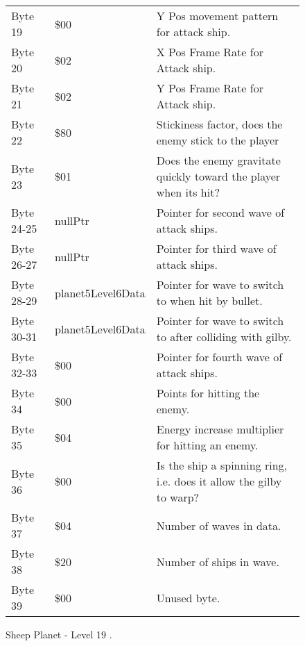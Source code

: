 \begin{figure}[H]
{\begin{adjustbox}{width=12cm}
\begin{tabular}{lll}
 Byte 19    & \$00                & Y Pos movement pattern for attack ship.                             \\
 Byte 20    & \$02                & X Pos Frame Rate for Attack ship.                                   \\
 Byte 21    & \$02                & Y Pos Frame Rate for Attack ship.                                   \\
 Byte 22    & \$80                & Stickiness factor, does the enemy stick to the player               \\
 Byte 23    & \$01                & Does the enemy gravitate quickly toward the player when its hit?    \\
 Byte 24-25 & nullPtr            & Pointer for second wave of attack ships.                            \\
 Byte 26-27 & nullPtr            & Pointer for third wave of attack ships.                             \\
 Byte 28-29 & planet5Level6Data  & Pointer for wave to switch to when hit by bullet.                   \\
 Byte 30-31 & planet5Level6Data  & Pointer for  wave to switch to after colliding with gilby.          \\
 Byte 32-33 & \$00                & Pointer for fourth wave of attack ships.                            \\
 Byte 34    & \$00                & Points for hitting the enemy.                                       \\
 Byte 35    & \$04                & Energy increase multiplier for hitting an enemy.                    \\
 Byte 36    & \$00                & Is the ship a spinning ring, i.e. does it allow the gilby to warp?  \\
 Byte 37    & \$04                & Number of waves in data.                                            \\
 Byte 38    & \$20                & Number of ships in wave.                                            \\
 Byte 39    & \$00                & Unused byte.                                                        \\
\bottomrule
\end{tabular}

  \end{adjustbox}

  }\caption*{Sheep Planet - Level 19
.}
\end{figure}

